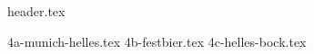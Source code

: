 \clearpage
{}
\divisorLine
{header.tex}
\begin{multicols}{2}
{4a-munich-helles.tex}
{4b-festbier.tex}
{4c-helles-bock.tex}
\end{multicols}